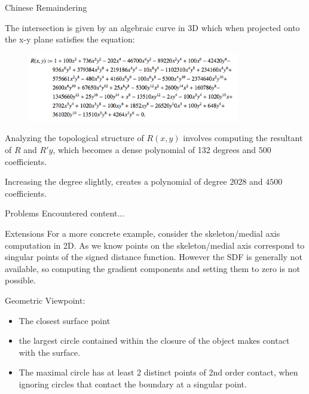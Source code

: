 \documentclass{beamer}
\begin{document}
	\begin{frame}{Chinese Remaindering}
		
		The intersection is given by an algebraic curve in 3D which when projected onto the x-y plane satisfies the equation:
		
		\begin{figure}[!ht]
			\centering
			\includegraphics[width=0.825\textwidth]{../Code/Images/R_xy_proj.png}
			\label{fig:FF_book_image}
		\end{figure}
		
		Analyzing the topological structure of $R(x,y)$ involves computing the resultant of $R$ and $R'y$, which becomes a dense polynomial of 132 degrees and $500$ coefficients.
		\vspace{0.2in}
		
		Increasing the degree slightly, creates a polynomial of degree $2028$ and $4500$ coefficients.
		
		 
	\end{frame}
	
	\begin{frame}{Problems Encountered}
		content...
	\end{frame}
	
	\begin{frame}{Extensions}
		For a more concrete example, consider the skeleton/medial axis computation in 2D. As we know points on the skeleton/medial axis correspond to singular points of the signed distance function. However the SDF is generally not available, so computing the gradient components and setting them to zero is not possible.
		
		\vspace{0.2in}
		Geometric Viewpoint:
		\begin{itemize}
			\item The closest surface point
			\item the largest circle contained within the closure of the object makes contact with the surface.
			\item The maximal circle has at least 2 distinct points of 2nd order contact, when ignoring circles that contact the boundary at a singular point.

		\end{itemize}		
		
				
		
	\end{frame}
	
\end{document}
